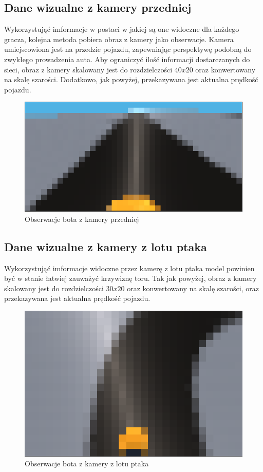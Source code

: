 \subsection{Dane wizualne z kamery przedniej}
Wykorzystująć imformacje w postaci w jakiej są one widoczne dla każdego gracza, kolejna metoda pobiera obraz z kamery jako obserwacje. Kamera umiejscowiona jest na przedzie pojazdu, zapewniając perspektywę podobną do zwykłego prowadzenia auta. Aby ograniczyć ilość informacji dostarczanych do sieci, obraz z kamery skalowany jest do rozdzielczości $40x20$ oraz konwertowany na skalę szarości. Dodatkowo, jak powyżej, przekazywana jest aktualna prędkość pojazdu.
\begin{figure}[H]
    \centering
    \includegraphics[width=.5\textwidth]{figures/observations_2}
    \caption{Obserwacje bota z kamery przedniej}
    \label{fig}
\end{figure}

\subsection{Dane wizualne z kamery z lotu ptaka}
Wykorzystująć imformacje widoczne przez kamerę z lotu ptaka model powinien być w stanie łatwiej zauważyć krzywiznę toru. Tak jak powyżej, obraz z kamery skalowany jest do rozdzielczości $30x20$ oraz konwertowany na skalę szarości, oraz przekazywana jest aktualna prędkość pojazdu.
\begin{figure}[H]
    \centering
    \includegraphics[width=.5\textwidth]{figures/observations_3}
    \caption{Obserwacje bota z kamery z lotu ptaka}
    \label{fig}
\end{figure}

